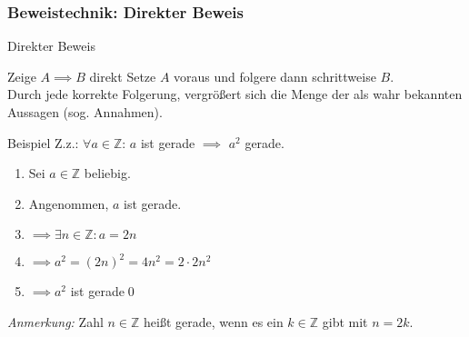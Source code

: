 \subsubsection{Beweistechnik: Direkter Beweis}
\begin{frame}[fragile]{Direkter Beweis}
    \begin{alertblock}{Zeige $A\implies B$ direkt}
    Setze $A$ voraus und folgere dann schrittweise $B$.\\
    Durch jede korrekte Folgerung, vergrößert sich die Menge der als wahr bekannten Aussagen (sog. Annahmen).
    \end{alertblock}
    \begin{exampleblock}{Beispiel}
    Z.z.: \alert<2|handout:0>{$\forall a\in\mathbb{Z}$}: \alert<3|handout:0>{$a$ ist gerade} $\implies$ \alert<6|handout:0>{$a^2$ gerade.}
    \begin{enumerate}
        \item \alert<2|handout:0>{Sei $a\in\mathbb{Z}$ beliebig.}
        \item \alert<3|handout:0>{Angenommen, $a$ ist gerade.}
        \item \alert<4|handout:0>{$\implies \exists n\in\mathbb{Z} : a = 2n$}
        \item \alert<5|handout:0>{$\implies a^2 = (2n)^2 = 4n^2 = 2 \cdot 2n^2$}
        \item \alert<6|handout:0>{$\implies a^2$ ist gerade}\qed\;
    \end{enumerate}
    \end{exampleblock}
    \small{\emph{\alert<4|handout:0>{Anmerkung:}} Zahl $n\in\mathbb{Z}$ heißt gerade, wenn es ein $k\in\mathbb{Z}$ gibt mit $n=2k$.}
\end{frame}

